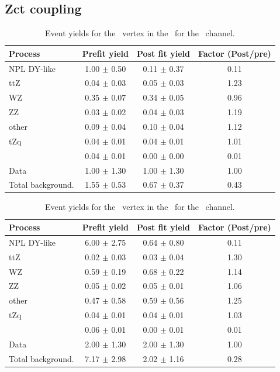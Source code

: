 \subsection*{Zct coupling}
  \begin{table}[htbp]
	\centering
	\caption{Event yields for the \Zct\ vertex in the \STCR\  for the \eee\ channel. }
	\begin{tabular} {l c c c }
		\toprule
		Process & Prefit yield & Post fit yield & Factor (Post/pre) \\
		\midrule
		NPL DY-like & 1.00 $ \pm $ 0.50 & 0.11 $ \pm $ 0.37 & 0.11 \\ 
		ttZ & 0.04 $ \pm $ 0.03 & 0.05 $ \pm $ 0.03 & 1.23 \\ 
		WZ & 0.35 $ \pm $ 0.07 & 0.34 $ \pm $ 0.05 & 0.96 \\ 
		ZZ & 0.03 $ \pm $ 0.02 & 0.04 $ \pm $ 0.03 & 1.19 \\ 
		other & 0.09 $ \pm $ 0.04 & 0.10 $ \pm $ 0.04 & 1.12 \\ 
		tZq & 0.04 $ \pm $ 0.01 & 0.04 $ \pm $ 0.01 & 1.01 \\ 
		\kZct  & 0.04 $ \pm $ 0.01 & 0.00 $ \pm $ 0.00 & 0.01\\
		\hdashline
		Data & 1.00 $ \pm $ 1.30 & 1.00 $ \pm $ 1.30 & 1.00\\
		Total background. & 1.55 $ \pm $ 0.53 & 0.67 $ \pm $ 0.37 & 0.43\\
		\bottomrule
	\end{tabular}
\end{table}
\begin{table}[htbp]
	\centering
	\caption{Event yields for the \Zct\ vertex in the \STCR\  for the \eemu\ channel. }
	\begin{tabular} {l c c c }
		\toprule
		Process & Prefit yield & Post fit yield & Factor (Post/pre) \\
		\midrule
		NPL DY-like & 6.00 $ \pm $ 2.75 & 0.64 $ \pm $ 0.80 & 0.11 \\ 
		ttZ & 0.02 $ \pm $ 0.03 & 0.03 $ \pm $ 0.04 & 1.30 \\ 
		WZ & 0.59 $ \pm $ 0.19 & 0.68 $ \pm $ 0.22 & 1.14 \\ 
		ZZ & 0.05 $ \pm $ 0.02 & 0.05 $ \pm $ 0.01 & 1.06 \\ 
		other & 0.47 $ \pm $ 0.58 & 0.59 $ \pm $ 0.56 & 1.25 \\ 
		tZq & 0.04 $ \pm $ 0.01 & 0.04 $ \pm $ 0.01 & 1.03 \\ 
		\kZct  & 0.06 $ \pm $ 0.01 & 0.00 $ \pm $ 0.01 & 0.01\\
		\hdashline
		Data & 2.00 $ \pm $ 1.30 & 2.00 $ \pm $ 1.30 & 1.00\\
		Total background. & 7.17 $ \pm $ 2.98 & 2.02 $ \pm $ 1.16 & 0.28\\
		\bottomrule
	\end{tabular}
\end{table}
